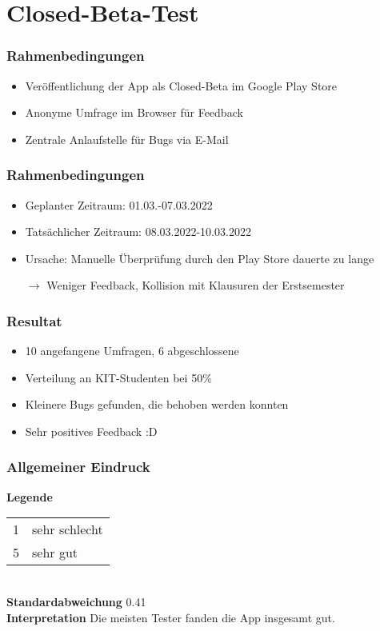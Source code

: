 \section{Closed-Beta-Test}

\begin{frame}\frametitle{Rahmenbedingungen}
    \begin{itemize}
        \item Veröffentlichung der App als Closed-Beta im Google Play Store
        \item Anonyme Umfrage im Browser für Feedback
        \item Zentrale Anlaufstelle für Bugs via E-Mail
    \end{itemize}
\end{frame}

\begin{frame}\frametitle{Rahmenbedingungen}
    \begin{itemize}
        \item Geplanter Zeitraum: 01.03.-07.03.2022
        \item Tatsächlicher Zeitraum: 08.03.2022-10.03.2022
        \item Ursache: Manuelle Überprüfung durch den Play Store dauerte zu lange
        \item[$\rightarrow$] Weniger Feedback, Kollision mit Klausuren der Erstsemester
    \end{itemize}
\end{frame}

\begin{frame}\frametitle{Resultat}
    \begin{itemize}
        \item 10 angefangene Umfragen, 6 abgeschlossene
        \item Verteilung an KIT-Studenten bei 50\%
        \item Kleinere Bugs gefunden, die behoben werden konnten
        \item Sehr positives Feedback :D
    \end{itemize}
\end{frame}

\begin{frame}\frametitle{Allgemeiner Eindruck}
    \begin{minipage}{\textwidth}
        \begin{minipage}{.49\textwidth}
        \end{minipage}
        \begin{minipage}{.49\textwidth}
            \textbf{Legende} 
            \begin{tabular}{l l}
                1 & sehr schlecht \\
                5 & sehr gut
            \end{tabular}\\
            \textbf{Standardabweichung}
            0.41\\
            \textbf{Interpretation}
            Die meisten Tester fanden die App insgesamt gut.
        \end{minipage}
    \end{minipage}
\end{frame}

